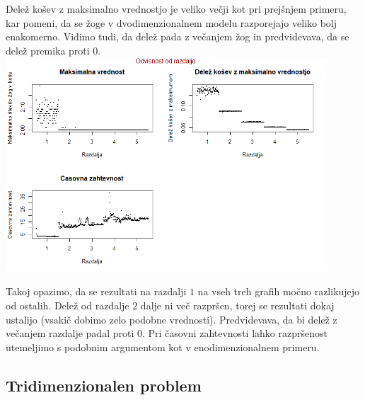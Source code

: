 \documentclass[a4paper, 11pt]{article}
\begin{document}
Delež košev z maksimalno vrednostjo je veliko večji kot pri prejšnjem primeru, kar pomeni, da se žoge v dvodimenzionalnem modelu razporejajo veliko bolj enakomerno. Vidimo tudi, da delež pada z večanjem žog in predvidevava, da se delež premika proti $0$.
\bigbreak
\includegraphics[width=12cm, height= 8cm]{dim2_glede_na_razdaljo1.png}


Takoj opazimo, da se rezultati na razdalji $1$ na vseh treh grafih močno razlikujejo od ostalih. Delež od razdalje $2$ dalje ni več razpršen, torej se rezultati dokaj ustalijo (vsakič dobimo zelo podobne vrednosti). Predvidevava, da bi delež
z večanjem razdalje padal proti 0.
Pri časovni zahtevnosti lahko razpršenost utemeljimo s podobnim argumentom kot v enodimenzionalnem primeru.

\subsection{Tridimenzionalen problem}
\end{document}

